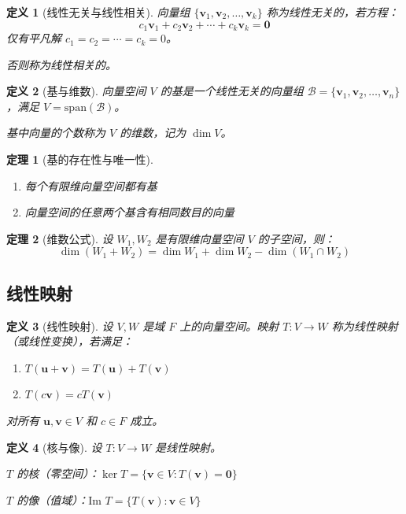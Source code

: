 \documentclass[12pt]{article}
\newtheorem{theorem}{定理}[section]
\newtheorem{definition}{定义}[section]
\begin{document}
\begin{definition}[线性无关与线性相关]
向量组 $\{\mathbf{v}_1, \mathbf{v}_2, \ldots, \mathbf{v}_k\}$ 称为线性无关的，若方程：
$$c_1\mathbf{v}_1 + c_2\mathbf{v}_2 + \cdots + c_k\mathbf{v}_k = \mathbf{0}$$
仅有平凡解 $c_1 = c_2 = \cdots = c_k = 0$。

否则称为线性相关的。
\end{definition}

\begin{definition}[基与维数]
向量空间 $V$ 的基是一个线性无关的向量组 $\mathcal{B} = \{\mathbf{v}_1, \mathbf{v}_2, \ldots, \mathbf{v}_n\}$，满足 $V = \text{span}(\mathcal{B})$。

基中向量的个数称为 $V$ 的维数，记为 $\dim V$。
\end{definition}

\begin{theorem}[基的存在性与唯一性]
\begin{enumerate}
\item 每个有限维向量空间都有基
\item 向量空间的任意两个基含有相同数目的向量
\end{enumerate}
\end{theorem}

\begin{theorem}[维数公式]
设 $W_1, W_2$ 是有限维向量空间 $V$ 的子空间，则：
$$\dim(W_1 + W_2) = \dim W_1 + \dim W_2 - \dim(W_1 \cap W_2)$$
\end{theorem}

\subsection{线性映射}

\begin{definition}[线性映射]
设 $V, W$ 是域 $F$ 上的向量空间。映射 $T: V \to W$ 称为线性映射（或线性变换），若满足：
\begin{enumerate}
\item $T(\mathbf{u} + \mathbf{v}) = T(\mathbf{u}) + T(\mathbf{v})$
\item $T(c\mathbf{v}) = cT(\mathbf{v})$
\end{enumerate}
对所有 $\mathbf{u}, \mathbf{v} \in V$ 和 $c \in F$ 成立。
\end{definition}

\begin{definition}[核与像]
设 $T: V \to W$ 是线性映射。

$T$ 的核（零空间）：$\ker T = \{\mathbf{v} \in V : T(\mathbf{v}) = \mathbf{0}\}$

$T$ 的像（值域）：$\text{Im } T = \{T(\mathbf{v}) : \mathbf{v} \in V\}$
\end{definition}
\end{document}
